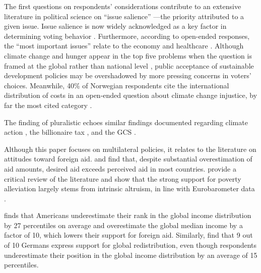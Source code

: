 \documentclass[12pt,english]{article}
\begin{document}
\begin{bibunit}
The first questions on respondents' considerations contribute to an extensive literature in political science on ``issue salience'' ---the priority attributed to a given issue. Issue salience is now widely acknowledged as a key factor in determining voting behavior \citep{repass_issue_1971,egan_partisan_2013,krosnick_role_1988,dennison_review_2019,edwards_explaining_1995}. Furthermore, according to open-ended responses, the ``most important issues'' relate to the economy and healthcare \citep{wlezien_salience_2005}. Although climate change and hunger appear in the top five problems when the question is framed at the global rather than national level \citep{yeager_measuring_2011}, public acceptance of sustainable development policies may be overshadowed by more pressing concerns in voters' choices. Meanwhile, 40\% of Norwegian respondents cite the international distribution of costs in an open-ended question about climate change injustice, by far the most cited category \citep{gregersen_poor_2025}. %

The finding of pluralistic echoes similar findings documented regarding %
climate action \citep{andre_misperceived_2024,andre_globally_2024,mildenberger_beliefs_2019}, the billionaire tax \citep{cappelen_majority_2025}, and the GCS \citep{fabre_majority_2025}. 

Although this paper focuses on multilateral policies, it relates to the literature on attitudes toward foreign aid. \cite{kaufmann_foreign_2019} and \cite{fabre_majority_2025} find that, despite substantial overestimation of aid amounts, desired aid exceeds perceived aid in most countries. \cite{hudson_mile_2012} provide a critical review of the literature and show that the strong support for poverty alleviation largely stems from intrinsic altruism, in line with Eurobarometer data \citep{cho_ideology_2024}. 

\cite{nair_misperceptions_2018} finds that Americans underestimate their rank in the global income distribution by 27 percentiles on average and overestimate the global median income by a factor of 10, which lowers their support for foreign aid. Similarly, \cite{fehr_your_2022} find that 9 out of 10 Germans express support for global redistribution, even though respondents underestimate their position in the global income distribution by an average of 15 percentiles. %


\end{bibunit}
\end{document}
